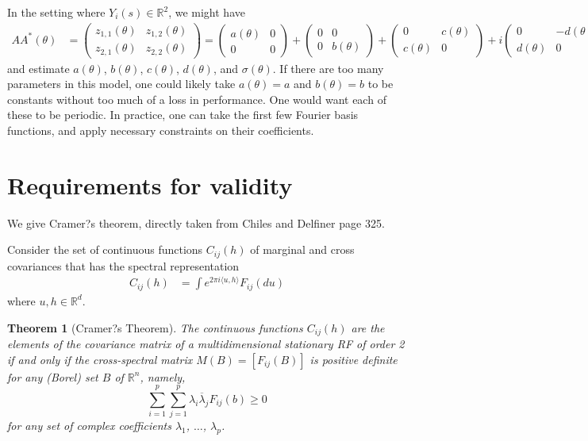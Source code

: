 \documentclass[11pt]{article}
\newtheorem{theorem}{Theorem}
\begin{document}
In the setting where $Y_i(s) \in \mathbb{R}^2$, we might have \begin{align*}
AA^*(\theta) &= \begin{pmatrix}z_{1,1}(\theta) & z_{1,2}(\theta)  \\
z_{2,1}(\theta) & z_{2,2}(\theta)\end{pmatrix}= \begin{pmatrix} a(\theta)  & 0 \\ 0 & 0 \end{pmatrix}+ \begin{pmatrix} 0  & 0 \\ 0 & b(\theta) \end{pmatrix}+    \begin{pmatrix} 0  & c(\theta) \\ c(\theta) & 0 \end{pmatrix} + i\begin{pmatrix} 0  & -d(\theta) \\ d(\theta) & 0 \end{pmatrix}
\end{align*}and estimate $a(\theta)$, $b(\theta)$, $c(\theta)$, $d(\theta)$, and $\sigma(\theta)$. If there are too many parameters in this model, one could likely take $a(\theta) = a$ and $b(\theta) = b$ to be constants without too much of a loss in performance. One would want each of these to be periodic. In practice, one can take the first few Fourier basis functions, and apply necessary constraints on their coefficients.

\section{Requirements for validity}

We give Cramer?s theorem, directly taken from Chiles and Delfiner page 325.

Consider the set of continuous functions $C_{ij}(h)$ of marginal and cross covariances that has the spectral representation \begin{align*}
C_{ij}(h) &= \int e^{2\pi i \langle u, h\rangle} F_{ij}(du)
\end{align*}where $u, h \in \mathbb{R}^d$.

\begin{theorem}[Cramer?s Theorem]
The continuous functions $C_{ij}(h)$ are the elements of the covariance matrix of a multidimensional stationary RF of order 2 if and only if the cross-spectral matrix $M(B) = [F_{ij}(B)]$ is positive definite for any (Borel) set $B$ of $\mathbb{R}^n$, namely, $$\sum_{i=1}^p \sum_{j=1}^p \lambda_i \overline{\lambda}_jF_{ij}(b)\geq 0$$for any set of complex coefficients $\lambda_1$, $\dots$, $\lambda_p$.
\end{theorem}
\end{document}
